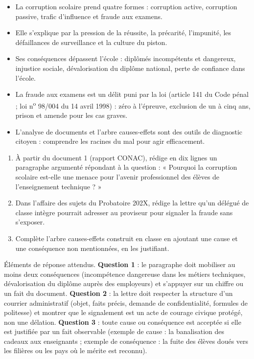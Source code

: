 \documentclass[11pt]{article}
\begin{document}
\begin{aretenir}[L'essentiel du TD2]
\begin{itemize}
\item La corruption scolaire prend quatre formes : corruption active, corruption passive, trafic d'influence et fraude aux examens.
\item Elle s'explique par la pression de la réussite, la précarité, l'impunité, les défaillances de surveillance et la culture du piston.
\item Ses conséquences dépassent l'école : diplômés incompétents et dangereux, injustice sociale, dévalorisation du diplôme national, perte de confiance dans l'école.
\item La fraude aux examens est un délit puni par la loi (article 141 du Code pénal ; loi n\textsuperscript{o} 98/004 du 14 avril 1998) : zéro à l'épreuve, exclusion de un à cinq ans, prison et amende pour les cas graves.
\item L'analyse de documents et l'arbre causes-effets sont des outils de diagnostic citoyen : comprendre les racines du mal pour agir efficacement.
\end{itemize}
\end{aretenir}

\begin{exercice}
\begin{enumerate}
\item À partir du document 1 (rapport CONAC), rédige en dix lignes un paragraphe argumenté répondant à la question : « Pourquoi la corruption scolaire est-elle une menace pour l'avenir professionnel des élèves de l'enseignement technique ? »
\item Dans l'affaire des sujets du Probatoire 202X, rédige la lettre qu'un délégué de classe intègre pourrait adresser au proviseur pour signaler la fraude sans s'exposer.
\item Complète l'arbre causes-effets construit en classe en ajoutant une cause et une conséquence non mentionnées, en les justifiant.
\end{enumerate}
\end{exercice}

\begin{corrige}
Éléments de réponse attendus. \textbf{Question 1} : le paragraphe doit mobiliser au moins deux conséquences (incompétence dangereuse dans les métiers techniques, dévalorisation du diplôme auprès des employeurs) et s'appuyer sur un chiffre ou un fait du document. \textbf{Question 2} : la lettre doit respecter la structure d'un courrier administratif (objet, faits précis, demande de confidentialité, formules de politesse) et montrer que le signalement est un acte de courage civique protégé, non une délation. \textbf{Question 3} : toute cause ou conséquence est acceptée si elle est justifiée par un fait observable (exemple de cause : la banalisation des cadeaux aux enseignants ; exemple de conséquence : la fuite des élèves doués vers les filières ou les pays où le mérite est reconnu).
\end{corrige}
\end{document}
